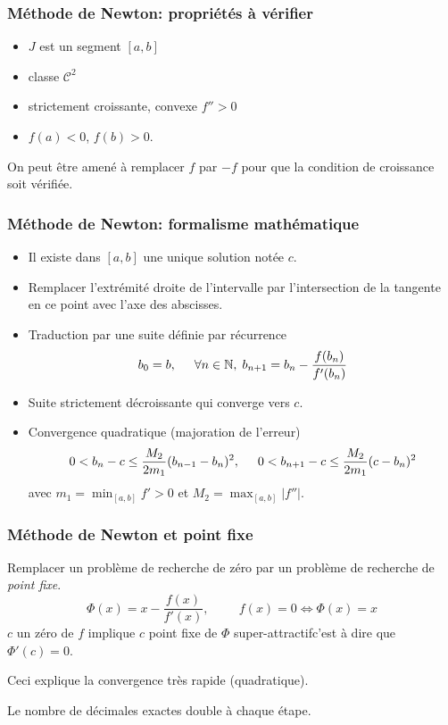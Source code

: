 \begin{frame}
  \frametitle{Méthode de Newton: propriétés à vérifier}
\begin{itemize}
  \item $J$ est un segment $[a,b]$
  \item classe $\mathcal{C}^2$
  \item strictement croissante, convexe $f''>0$
  \item $f(a)<0$, $f(b)>0$. 
\end{itemize}
On peut être amené à remplacer $f$ par $-f$ pour que la condition de croissance soit vérifiée. 
\end{frame}

\begin{frame}
  \frametitle{Méthode de Newton: formalisme mathématique}
\begin{itemize}
  \item Il existe dans $[a,b]$ une unique solution notée $c$.
  \item Remplacer l'extrémité droite de l'intervalle par l'intersection de la tangente en ce point avec l'axe des abscisses.
  \item Traduction par une suite définie par récurrence
\begin{displaymath}
  b_0 = b,\hspace{0.5cm}\forall n\in\mathbb{N},\;b_{n+1} = b_n -\frac{f(b_n)}{f'(b_n)}
\end{displaymath}
  \item Suite strictement décroissante qui converge vers $c$.
  \item Convergence quadratique (majoration de l'erreur)
\begin{displaymath}
  0< b_n -c \leq \frac{M_2}{2m_1}(b_{n-1}-b_n)^2,\hspace{0.5cm} 0< b_{n+1} -c \leq \frac{M_2}{2m_1}(c-b_n)^2
\end{displaymath}
avec $m_1 = \min_{[a,b]} f'>0$ et $M_2 = \max_{[a,b]}\left|f''\right|$.
\end{itemize}
\end{frame}

\begin{frame}
  \frametitle{Méthode de Newton et point fixe}
Remplacer un problème de recherche de zéro par un problème de recherche de \emph{point fixe}.
\begin{displaymath}
  \Phi(x) = x -\frac{f(x)}{f'(x)}, \hspace{1cm} f(x) = 0 \Leftrightarrow \Phi(x) = x
\end{displaymath}
$c$ un zéro de $f$ implique $c$ point fixe de $\Phi$ \og super-attractif\fg c'est à dire que $\Phi'(c)=0$.

Ceci explique la convergence très rapide (quadratique).

Le nombre de décimales exactes double à chaque étape.
\end{frame}

